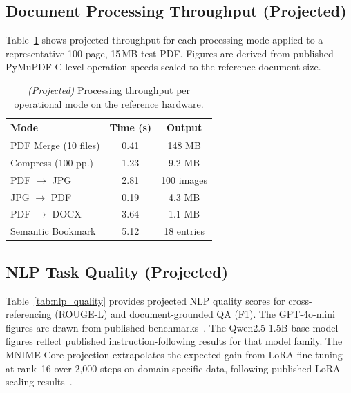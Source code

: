 \documentclass[11pt]{article}
\begin{document}
\subsection{Document Processing Throughput (Projected)}
\label{sec:doc_perf}

Table~\ref{tab:throughput} shows projected throughput for each processing
mode applied to a representative 100-page, 15\,MB test PDF.
Figures are derived from published PyMuPDF C-level operation speeds
scaled to the reference document size.

\begin{table}[h!]
\centering
\small
\begin{tabular}{@{}lcc@{}}
\toprule
\textbf{Mode} & \textbf{Time (s)} & \textbf{Output} \\
\midrule
PDF Merge (10 files) & 0.41 & 148 MB \\
Compress (100 pp.)   & 1.23 & 9.2 MB \\
PDF $\rightarrow$ JPG & 2.81 & 100 images \\
JPG $\rightarrow$ PDF & 0.19 & 4.3 MB \\
PDF $\rightarrow$ DOCX & 3.64 & 1.1 MB \\
Semantic Bookmark & 5.12 & 18 entries \\
\bottomrule
\end{tabular}
\caption{\textit{(Projected)} Processing throughput per operational mode
on the reference hardware.}
\label{tab:throughput}
\end{table}

\subsection{NLP Task Quality (Projected)}
\label{sec:nlp_quality}

Table~\ref{tab:nlp_quality} provides projected NLP quality scores for
cross-referencing (ROUGE-L) and document-grounded QA (F1).
The GPT-4o-mini figures are drawn from published benchmarks~\cite{openai2024gpt4}.
The Qwen2.5-1.5B base model figures reflect published instruction-following
results for that model family.
The MNIME-Core projection extrapolates the expected gain from LoRA
fine-tuning at rank~16 over 2,000 steps on domain-specific data,
following published LoRA scaling results~\cite{hu2021lora}.
\end{document}
